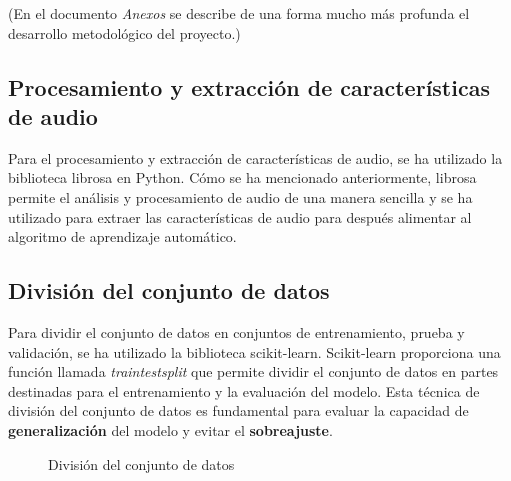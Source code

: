 (En el documento \textit{Anexos} se describe de una forma mucho más profunda el desarrollo metodológico del proyecto.)

\subsection{Procesamiento y extracción de características de audio}

Para el procesamiento y extracción de características de audio, se ha utilizado la biblioteca librosa en Python. Cómo se ha mencionado anteriormente, librosa permite el análisis y procesamiento de audio de una manera sencilla y se ha utilizado para extraer las características de audio para después alimentar al algoritmo de aprendizaje automático.

\subsection{División del conjunto de datos}

Para dividir el conjunto de datos en conjuntos de entrenamiento, prueba y validación, se ha utilizado la biblioteca scikit-learn. 
Scikit-learn proporciona una función llamada \textit{train\textunderscore test\textunderscore split} que permite dividir el conjunto de datos en partes destinadas para el entrenamiento y la evaluación del modelo.
Esta técnica de división del conjunto de datos es fundamental para evaluar la capacidad de \textbf{generalización} del modelo y evitar el \textbf{sobreajuste}.

\begin{figure}
  \centering
  \caption{División del conjunto de datos}
\end{figure}

